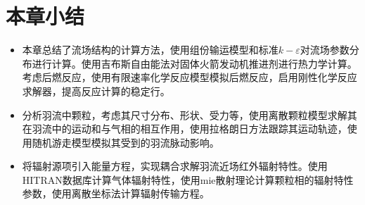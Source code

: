 \section{本章小结}
\begin{itemize}
	\item 本章总结了流场结构的计算方法，使用组份输运模型和标准$k-\varepsilon$对流场参数分布进行计算。使用吉布斯自由能法对固体火箭发动机推进剂进行热力学计算。考虑后燃反应，使用有限速率化学反应模型模拟后燃反应，启用刚性化学反应求解器，提高反应计算的稳定行。
	\item 分析羽流中颗粒，考虑其尺寸分布、形状、受力等，使用离散颗粒模型求解其在羽流中的运动和与气相的相互作用，使用拉格朗日方法跟踪其运动轨迹，使用随机游走模型模拟其受到的羽流脉动影响。
	\item 将辐射源项引入能量方程，实现耦合求解羽流近场红外辐射特性。使用HITRAN数据库计算气体辐射特性，使用mie散射理论计算颗粒相的辐射特性参数，使用离散坐标法计算辐射传输方程。
\end{itemize}

